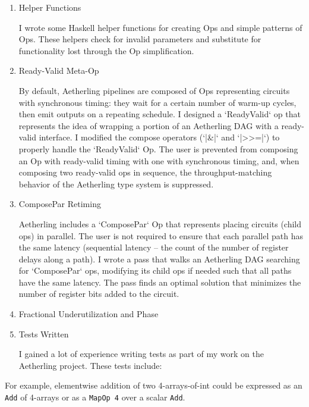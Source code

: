 \documentclass[11pt]{article}
\begin{document}
\begin{enumerate}
\item Helper Functions

I wrote some Haskell helper functions for creating Ops and simple
patterns of Ops. These helpers check for invalid parameters and
substitute for functionality lost through the Op simplification.

\item Ready-Valid Meta-Op

By default, Aetherling pipelines are composed of Ops representing
circuits with synchronous timing: they wait for a certain number of
warm-up cycles, then emit outputs on a repeating schedule. I designed
a `ReadyValid` op that represents the idea of wrapping a portion of an
Aetherling DAG with a ready-valid interface.  I modified the compose
operators (`|\&|` and `|>>=|`) to properly handle the `ReadyValid` Op.
The user is prevented from composing an Op with ready-valid timing
with one with synchronous timing, and, when composing two ready-valid
ops in sequence, the throughput-matching behavior of the Aetherling
type system is suppressed.

\item ComposePar Retiming

Aetherling includes a `ComposePar` Op that represents placing circuits
(child ops) in parallel. The user is not required to ensure that each
parallel path has the same latency (sequential latency -- the count of
the number of register delays along a path). I wrote a pass that walks
an Aetherling DAG searching for `ComposePar` ops, modifying its child
ops if needed such that all paths have the same latency. The pass
finds an optimal solution that minimizes the number of register bits
added to the circuit.

\item Fractional Underutilization and Phase



\item Tests Written

I gained a lot of experience writing tests as part of my work
on the Aetherling project. These tests include:

\end{enumerate}

For example, elementwise addition of two
4-arrays-of-int could be expressed as an \texttt{Add} of 4-arrays or as
a \texttt{MapOp 4} over a scalar \texttt{Add}.
\end{document}
